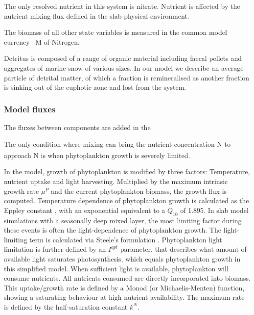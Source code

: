 \documentclass[template.tex]{subfiles}
\begin{document}
The only resolved nutrient in this system is nitrate. 
Nutrient is affected by the nutrient mixing flux defined in the slab physical environment. 

The biomass of all other state variables is measured in the common model currency \unit{\mu M} of Nitrogen. 




Detritus is composed of a range of organic material including faecal pellets and aggregates of marine snow of various sizes. In our model we describe an average particle of detrital matter, of which a fraction is remineralised as another fraction is sinking out of the euphotic zone and lost from the system. 



\subsubsection{Model fluxes}
The fluxes between components are added in the




The only condition where mixing can bring the nutrient concentration N to approach \unit{N^\emptyset} is when phytoplankton growth is severely limited. 

In the model, growth of phytoplankton is modified by three factors: Temperature, nutrient uptake and light harvesting. Multiplied by the maximum intrinsic growth rate $\mu^P$ and the current phytoplankton biomass, the growth flux is computed. 
Temperature dependence of phytoplankton growth is calculated as the Eppley constant \citep{Eppley1972TemperatureSea}, with an exponential equivalent to a $Q_{10}$ of 1.895.
In slab model simulations with a seasonally deep mixed layer, the most limiting factor during these events is often the light-dependence of phytoplankton growth. The light-limiting term is calculated via Steele's formulation \citep{Steele1962EnvironmentalSea}. Phytoplankton light limitation is further defined by an $I^{opt}$ parameter, that describes what amount of available light saturates photosynthesis, which equals phytoplankton growth in this simplified model.
When sufficient light is available, phytoplankton will consume nutrients. All nutrients consumed are directly incorporated into biomass. This uptake/growth rate is defined by a Monod (or Michaelis-Menten) function, showing a saturating behaviour at high nutrient availability. The maximum rate is defined by the half-saturation constant $k^N$. 
\end{document}
